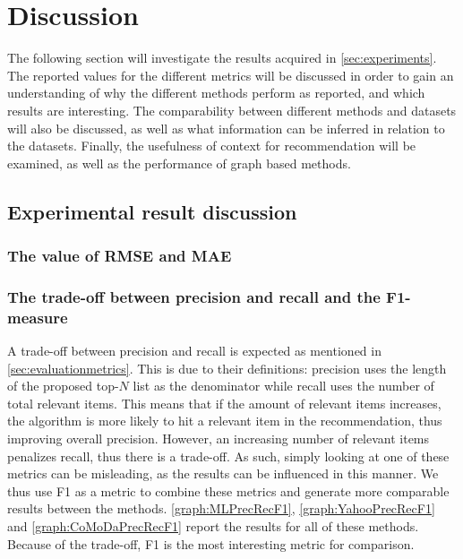 \section{Discussion}\label{sec:discussion}
The following section will investigate the results acquired in \autoref{sec:experiments}.
The reported values for the different metrics will be discussed in order to gain an understanding of why the different methods perform as reported, and which results are interesting.
The comparability between different methods and datasets will also be discussed, as well as what information can be inferred in relation to the datasets.
Finally, the usefulness of context for recommendation will be examined, as well as the performance of graph based methods.


\subsection{Experimental result discussion}
\subsubsection{The value of RMSE and MAE}
\subsubsection{The trade-off between precision and recall and the F1-measure}
A trade-off between precision and recall is expected as mentioned in \autoref{sec:evaluationmetrics}.
This is due to their definitions: precision uses the length of the proposed top-$N$ list as the denominator while recall uses the number of total relevant items.
This means that if the amount of relevant items increases, the algorithm is more likely to hit a relevant item in the recommendation, thus improving overall precision.
However, an increasing number of relevant items penalizes recall, thus there is a trade-off.
As such, simply looking at one of these metrics can be misleading, as the results can be influenced in this manner.
We thus use F1 as a metric to combine these metrics and generate more comparable results between the methods.
\autoref{graph:MLPrecRecF1}, \autoref{graph:YahooPrecRecF1} and \autoref{graph:CoMoDaPrecRecF1} report the results for all of these methods.
Because of the trade-off, F1 is the most interesting metric for comparison.
